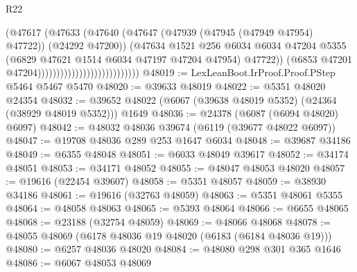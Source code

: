 \begin{lexlean}{R22}
\begin{coremodule}
                                                    (@47617
                                                      (@47633
                                                        (@47640
                                                          (@47647
                                                            (@47939 (@47945 (@47949 @47954) @47722))
                                                            (@24292 @47200))
                                                          (@47634
                                                            @1521
                                                            @256
                                                            @6034
                                                            @6034
                                                            @47204
                                                            @5355
                                                            (@6829
                                                              @47621
                                                              @1514
                                                              @6034
                                                              @47197
                                                              @47204
                                                              @47954)
                                                            @47722))
                                                        (@6853
                                                          @47201
                                                          @47204)))))))))))))))))))))))))))
@48019 := LexLeanBoot.IrProof.Proof.PStep @5464 @5467 @5470
@48020 := @39633 @48019
@48022 := @5351 @48020 @24354
@48032 := @39652 @48022 (@6067 (@39638 @48019 @5352) (@24364 (@38929 @48019 @5352))) @1649
@48036 := @24378 (@6087 (@6094 @48020) @6097)
@48042 := @48032 @48036 @39674 (@6119 (@39677 @48022 @6097))
@48047 := @19708 @48036 @289 @253 @1647 @6034
@48048 := @39687 @34186
@48049 := @6355 @48048
@48051 := @6033 @48049 @39617
@48052 := @34174 @48051
@48053 := @34171 @48052
@48055 := @48047 @48053 @48020
@48057 := @19616 (@22454 @39607)
@48058 := @5351 @48057
@48059 := @38930 @34186
@48061 := @19616 (@32763 @48059)
@48063 := @5351 @48061 @5355
@48064 := @48058 @48063
@48065 := @5393 @48064
@48066 := @6655 @48065
@48068 := @23188 (@32754 @48059)
@48069 := @48066 @48068
@48078 := @48055 @48069 (@6178 @48036 @19 @48020 (@6183 (@6184 @48036 @19)))
@48080 := @6257 @48036 @48020
@48084 := @48080 @298 @301 @365 @1646
@48086 := @6067 @48053 @48069

\end{coremodule}
\end{lexlean}
